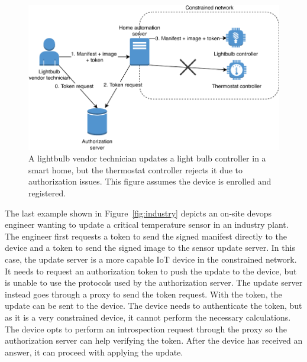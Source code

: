 \documentclass[0-thesis.tex]{subfiles}
\begin{document}
\begin{figure}[t]
    \caption[A lightbulb vendor technician updates a light bulb controller in a smart
    home.]
        {A lightbulb vendor technician updates a light bulb controller in a smart
                home, but the thermostat controller rejects it due to authorization
                issues. This figure assumes the device is enrolled and registered.}
    \label{fig:smart-home}
    \includegraphics{images/use-case-smart-home.pdf}
\end{figure}

The last example shown in Figure~\ref{fig:industry} depicts an on-site devops engineer
wanting to update a critical temperature sensor in an industry plant. The engineer first
requests a token to send the signed manifest directly to the device and a token to send
the signed image to the sensor update server. In this case, the update server is a more
capable IoT device in the constrained network. It needs to request an authorization token
to push the update to the device, but is unable to use the protocols used by the
authorization server. The update server instead goes through a proxy to send the token
request. With the token, the update can be sent to the device. The device needs to
authenticate the token, but as it is a very constrained device, it cannot perform the
necessary calculations. The device opts to perform an introspection request through the
proxy so the authorization server can help verifying the token. After the device has
received an answer, it can proceed with applying the update.
\end{document}
